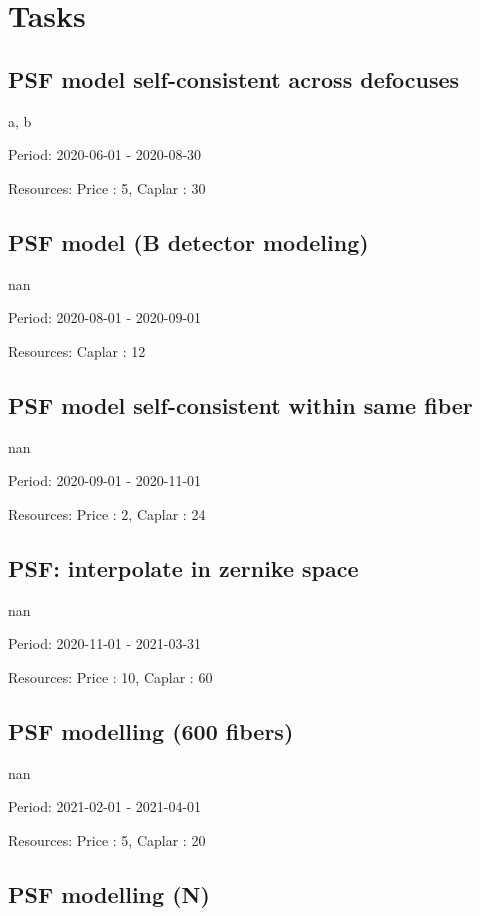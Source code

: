 \section{Tasks}\subsection{PSF model self-consistent across defocuses}

a, b

Period: 2020-06-01 - 2020-08-30

Resources: Price : 5, Caplar : 30

\subsection{PSF model (B detector modeling)}

nan

Period: 2020-08-01 - 2020-09-01

Resources: Caplar : 12

\subsection{PSF model self-consistent within same fiber}

nan

Period: 2020-09-01 - 2020-11-01

Resources: Price : 2, Caplar : 24

\subsection{PSF: interpolate in zernike space}

nan

Period: 2020-11-01 - 2021-03-31

Resources: Price : 10, Caplar : 60

\subsection{PSF modelling (600 fibers)}

nan

Period: 2021-02-01 - 2021-04-01

Resources: Price : 5, Caplar : 20

\subsection{PSF modelling (N)}

